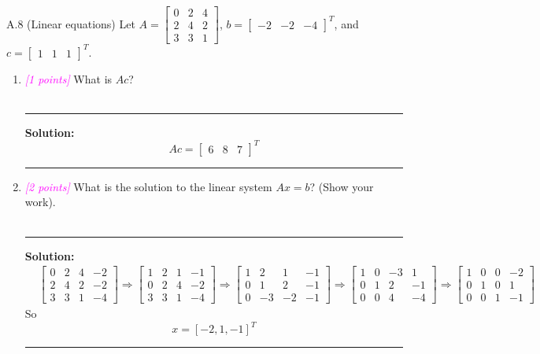 \documentclass{article}
\newcommand{\1}{\mathbf{1}}
\newcommand{\points}[1]{\small\textcolor{magenta}{\emph{[#1 points]}} \normalsize}
\begin{document}
A.8 (Linear equations) Let $A = \begin{bmatrix} 0 & 2 & 4 \\ 2 & 4 & 2 \\ 3 & 3 & 1 \end{bmatrix}$, $b = \begin{bmatrix} -2 & -2 & -4 \end{bmatrix}^T$, and $c=\begin{bmatrix} 1 & 1 & 1 \end{bmatrix}^T$.
\begin{enumerate}
	\item \points{1} What is $Ac$?
	\\
\\
    \noindent\rule{\textwidth}{1pt}
    {\bf Solution:}\\
    $$\boxed{Ac = \begin{bmatrix} 6 & 8 & 7 \end{bmatrix}^T}$$
    
    \noindent\rule{\textwidth}{1pt}
    
	\item \points{2} What is the solution to the linear system $Ax = b$? (Show your work).	\\
\\
    \noindent\rule{\textwidth}{1pt}
    {\bf Solution:}\\
    \begin{align*}
        &\left[ \begin{array} {ccc|c}
        0 & 2 & 4 & -2\\ 
        2 & 4 & 2 & -2\\ 
        3 & 3 & 1 & -4
        \end{array}\right] 
        \Rightarrow
        \left[ \begin{array} {ccc|c}
        1 & 2 & 1 & -1\\ 
        0 & 2 & 4 & -2\\ 
        3 & 3 & 1 & -4
        \end{array}\right]
        \Rightarrow
        \left[ \begin{array} {ccc|c}
        1 & 2 & 1 & -1\\ 
        0 & 1 & 2 & -1\\ 
        0 & -3 & -2 & -1
        \end{array}\right]
        \Rightarrow
        \left[ \begin{array} {ccc|c}
        1 & 0 & -3 & 1\\ 
        0 & 1 & 2 & -1\\ 
        0 & 0 & 4 & -4
        \end{array}\right]
        \Rightarrow
        \left[ \begin{array} {ccc|c}
        1 & 0 & 0 & -2\\ 
        0 & 1 & 0 & 1\\ 
        0 & 0 & 1 & -1
        \end{array}\right]
    \end{align*}
    So 
    $$
    \boxed{x = [-2, 1, -1]^T}
    $$
    
    \noindent\rule{\textwidth}{1pt}
\end{enumerate}
\end{document}
